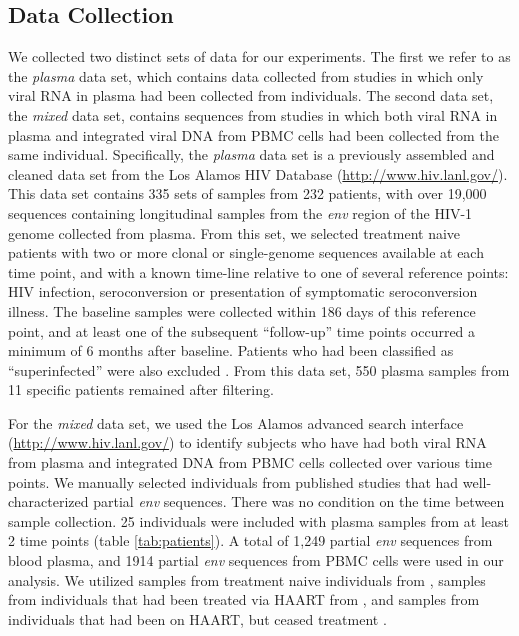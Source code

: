\subsection * {Data Collection} \label{subsec:dcollection}
We collected two distinct sets of data for our experiments. The first we refer to as the {\em plasma} data set, which contains data collected from studies in which only viral RNA in plasma had been collected from individuals. 
The second data set, the {\em mixed} data set, contains sequences from studies in which both viral RNA in plasma and integrated viral DNA from PBMC cells had been collected from the same individual.
Specifically, the {\em plasma} data set \citep{McCloskey14} is a previously assembled and cleaned data set from the Los Alamos HIV Database (\href{http://www.hiv.lanl.gov/}{http://www.hiv.lanl.gov/}). 
This data set contains 335 sets of samples from 232 patients, with over 19,000 sequences \citep{McCloskey14} containing longitudinal samples from the {\em env} region of the HIV-1 genome collected from plasma. 
From this set, we selected treatment naive patients with two or more clonal or single-genome sequences available at each time point, and with a known time-line relative to one of several reference points: HIV infection, seroconversion or presentation of symptomatic seroconversion illness. 
The baseline samples were collected within 186 days of this reference point, and at least one of the subsequent ``follow-up'' time points occurred a minimum of 6 months after baseline.
Patients who had been classified as ``superinfected'' were also excluded \citep{McCloskey14}. 
From this data set, 550 plasma samples from 11 specific patients remained after filtering.


For the {\em mixed} data set, we used the Los Alamos advanced search interface (\href{http://www.hiv.lanl.gov/}{http://www.hiv.lanl.gov/}) to identify subjects who have had both viral RNA from plasma and integrated DNA from PBMC cells collected over various time points. We manually selected individuals from published studies that had well-characterized partial {\em env} sequences. 
There was no condition on the time between sample collection. 
25 individuals were included with plasma samples from at least 2 time points (table \ref{tab:patients}).
A total of 1,249 partial {\em env} sequences from blood plasma, and 1914 partial {\em env} sequences from PBMC cells were used in our analysis. 
We utilized samples from treatment naive individuals from \cite{Shankarappa99, Novitsky09}, samples from individuals that had been treated via HAART from \cite{Llewellyn06}, and samples from individuals that had been on HAART, but ceased treatment \cite{Fischer04}. 
 

